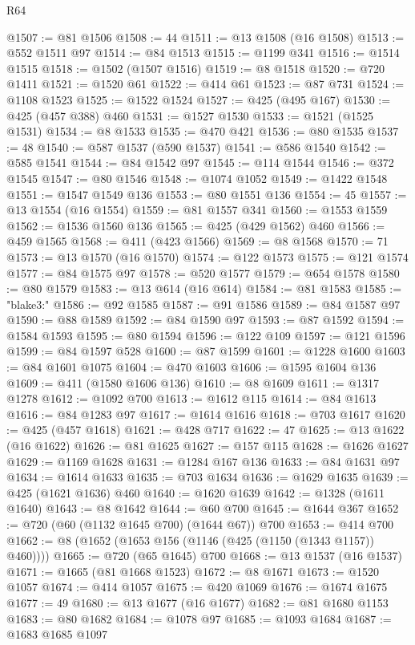 \begin{lexlean}{R64}
\begin{coremodule}
@1507 := @81 @1506
@1508 := 44
@1511 := @13 @1508 (@16 @1508)
@1513 := @552 @1511 @97
@1514 := @84 @1513
@1515 := @1199 @341
@1516 := @1514 @1515
@1518 := @1502 (@1507 @1516)
@1519 := @8 @1518
@1520 := @720 @1411
@1521 := @1520 @61
@1522 := @414 @61
@1523 := @87 @731
@1524 := @1108 @1523
@1525 := @1522 @1524
@1527 := @425 (@495 @167)
@1530 := @425 (@457 @388) @460
@1531 := @1527 @1530
@1533 := @1521 (@1525 @1531)
@1534 := @8 @1533
@1535 := @470 @421
@1536 := @80 @1535
@1537 := 48
@1540 := @587 @1537 (@590 @1537)
@1541 := @586 @1540
@1542 := @585 @1541
@1544 := @84 @1542 @97
@1545 := @114 @1544
@1546 := @372 @1545
@1547 := @80 @1546
@1548 := @1074 @1052
@1549 := @1422 @1548
@1551 := @1547 @1549 @136
@1553 := @80 @1551 @136
@1554 := 45
@1557 := @13 @1554 (@16 @1554)
@1559 := @81 @1557 @341
@1560 := @1553 @1559
@1562 := @1536 @1560 @136
@1565 := @425 (@429 @1562) @460
@1566 := @459 @1565
@1568 := @411 (@423 @1566)
@1569 := @8 @1568
@1570 := 71
@1573 := @13 @1570 (@16 @1570)
@1574 := @122 @1573
@1575 := @121 @1574
@1577 := @84 @1575 @97
@1578 := @520 @1577
@1579 := @654 @1578
@1580 := @80 @1579
@1583 := @13 @614 (@16 @614)
@1584 := @81 @1583
@1585 := "blake3:"
@1586 := @92 @1585
@1587 := @91 @1586
@1589 := @84 @1587 @97
@1590 := @88 @1589
@1592 := @84 @1590 @97
@1593 := @87 @1592
@1594 := @1584 @1593
@1595 := @80 @1594
@1596 := @122 @109
@1597 := @121 @1596
@1599 := @84 @1597 @528
@1600 := @87 @1599
@1601 := @1228 @1600
@1603 := @84 @1601 @1075
@1604 := @470 @1603
@1606 := @1595 @1604 @136
@1609 := @411 (@1580 @1606 @136)
@1610 := @8 @1609
@1611 := @1317 @1278
@1612 := @1092 @700
@1613 := @1612 @115
@1614 := @84 @1613
@1616 := @84 @1283 @97
@1617 := @1614 @1616
@1618 := @703 @1617
@1620 := @425 (@457 @1618)
@1621 := @428 @717
@1622 := 47
@1625 := @13 @1622 (@16 @1622)
@1626 := @81 @1625
@1627 := @157 @115
@1628 := @1626 @1627
@1629 := @1169 @1628
@1631 := @1284 @167 @136
@1633 := @84 @1631 @97
@1634 := @1614 @1633
@1635 := @703 @1634
@1636 := @1629 @1635
@1639 := @425 (@1621 @1636) @460
@1640 := @1620 @1639
@1642 := @1328 (@1611 @1640)
@1643 := @8 @1642
@1644 := @60 @700
@1645 := @1644 @367
@1652 := @720 (@60 (@1132 @1645 @700) (@1644 @67)) @700
@1653 := @414 @700
@1662 := @8 (@1652 (@1653 @156 (@1146 (@425 (@1150 (@1343 @1157)) @460))))
@1665 := @720 (@65 @1645) @700
@1668 := @13 @1537 (@16 @1537)
@1671 := @1665 (@81 @1668 @1523)
@1672 := @8 @1671
@1673 := @1520 @1057
@1674 := @414 @1057
@1675 := @420 @1069
@1676 := @1674 @1675
@1677 := 49
@1680 := @13 @1677 (@16 @1677)
@1682 := @81 @1680 @1153
@1683 := @80 @1682
@1684 := @1078 @97
@1685 := @1093 @1684
@1687 := @1683 @1685 @1097

\end{coremodule}
\end{lexlean}
